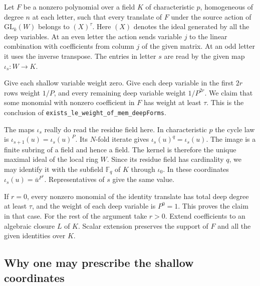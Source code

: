 \documentclass[11pt,letterpaper]{article}
\begin{document}
Let $F$ be a nonzero polynomial over a field $K$ of characteristic $p$, homogeneous of degree $n$ at each letter, such that every translate of $F$ under the source action of $\mathrm{GL}_k(W)$ belongs to $(X)^\tau$. Here $(X)$ denotes the ideal generated by all the deep variables. At an even letter the action sends variable $j$ to the linear combination with coefficients from column $j$ of the given matrix. At an odd letter it uses the inverse transpose. The entries in letter $s$ are read by the given map $\iota_s:W\longrightarrow K$.

Give each shallow variable weight zero. Give each deep variable in the first $2r$ rows weight $1/P$, and every remaining deep variable weight $1/P^{2r}$. We claim that some monomial with nonzero coefficient in $F$ has weight at least $\tau$. This is the conclusion of \texttt{exists\_le\_weight\_of\_mem\_deepForms}.

The maps $\iota_s$ really do read the residue field here. In characteristic $p$ the cycle law is $\iota_{s+1}(u)=\iota_s(u)^P$. Its $N$-fold iterate gives $\iota_s(u)^q=\iota_s(u)$. The image is a finite subring of a field and hence a field. The kernel is therefore the unique maximal ideal of the local ring $W$. Since its residue field has cardinality $q$, we may identify it with the subfield $\mathbb F_q$ of $K$ through $\iota_0$. In these coordinates $\iota_s(u)=\bar u^{P^s}$. Representatives of $s$ give the same value.

If $r=0$, every nonzero monomial of the identity translate has total deep degree at least $\tau$, and the weight of each deep variable is $P^0=1$. This proves the claim in that case. For the rest of the argument take $r>0$. Extend coefficients to an algebraic closure $L$ of $K$. Scalar extension preserves the support of $F$ and all the given identities over $K$.

\subsection{Why one may prescribe the shallow coordinates}
\end{document}
